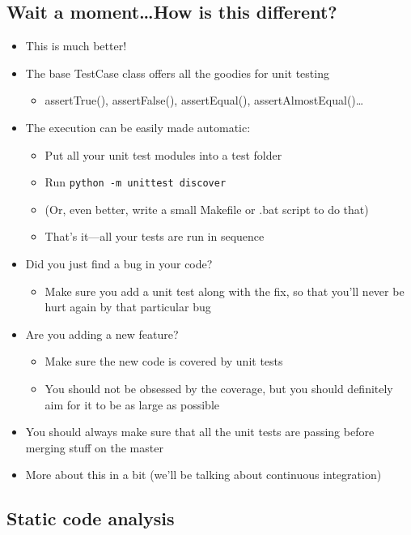 \subsection{Wait a moment\ldots How is this different?}

  \begin{itemize}
  \item This is much better!
  \item The base TestCase class offers all the goodies for unit testing
    \begin{itemize}
    \item assertTrue(), assertFalse(), assertEqual(), assertAlmostEqual()\ldots
    \end{itemize}
  \item The execution can be easily made automatic:
    \begin{itemize}
    \item Put all your unit test modules into a test folder
    \item Run \texttt{python -m unittest discover}
    \item (Or, even better, write a small Makefile or .bat script to do that)
    \item That's it---all your tests are run in sequence
    \end{itemize}
  \item Did you just find a bug in your code?
    \begin{itemize}
    \item Make sure you add a unit test along with the fix, so that you'll
      never be hurt again by that particular bug
    \end{itemize}
  \item Are you adding a new feature?
    \begin{itemize}
    \item Make sure the new code is covered by unit tests
    \item You should not be obsessed by the coverage, but you should
      definitely aim for it to be as large as possible
    \end{itemize}
  \item \alert{You should always make sure that all the unit tests are
    passing before merging stuff on the master}    
  \item More about this in a bit (we'll be talking about continuous integration)
  \end{itemize}

\subsection{Static code analysis}

